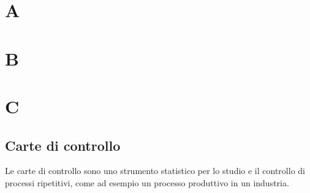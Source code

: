 \section{A}
\section{B}
\section{C}
\subsection*{Carte di controllo}
Le carte di controllo sono uno strumento statistico per lo studio e il controllo di processi ripetitivi, come ad esempio un processo produttivo in un industria.
